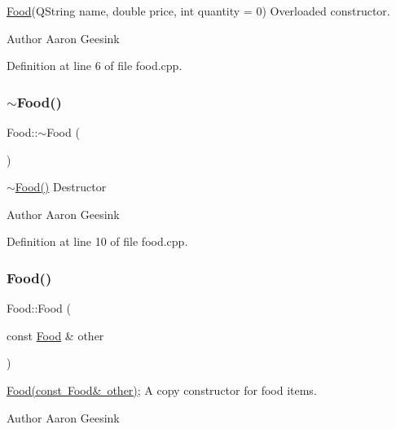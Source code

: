 \mbox{\hyperlink{class_food}{Food}}(Q\+String name, double price, int quantity = 0) Overloaded constructor. 

\begin{DoxyAuthor}{Author}
Aaron Geesink 
\end{DoxyAuthor}


Definition at line 6 of file food.\+cpp.

\mbox{\label{class_food_a6f25dffd1fb347c982a53b9a384c611a}} 
\subsubsection{\texorpdfstring{$\sim$Food()}{~Food()}}
{\footnotesize\ttfamily Food\+::$\sim$\+Food (\begin{DoxyParamCaption}{ }\end{DoxyParamCaption})}



\mbox{\hyperlink{class_food_a6f25dffd1fb347c982a53b9a384c611a}{$\sim$\+Food()}} Destructor 

\begin{DoxyAuthor}{Author}
Aaron Geesink 
\end{DoxyAuthor}


Definition at line 10 of file food.\+cpp.

\mbox{\label{class_food_a365c2d6175447d0fe29e57facc277570}} 
\subsubsection{\texorpdfstring{Food()}{Food()}\hspace{0.1cm}{\footnotesize\ttfamily [3/4]}}
{\footnotesize\ttfamily Food\+::\+Food (\begin{DoxyParamCaption}\item[{const \mbox{\hyperlink{class_food}{Food}} \&}]{other }\end{DoxyParamCaption})}



\mbox{\hyperlink{class_food_a365c2d6175447d0fe29e57facc277570}{Food(const Food\& other)}}; A copy constructor for food items. 

\begin{DoxyAuthor}{Author}
Aaron Geesink 
\end{DoxyAuthor}


